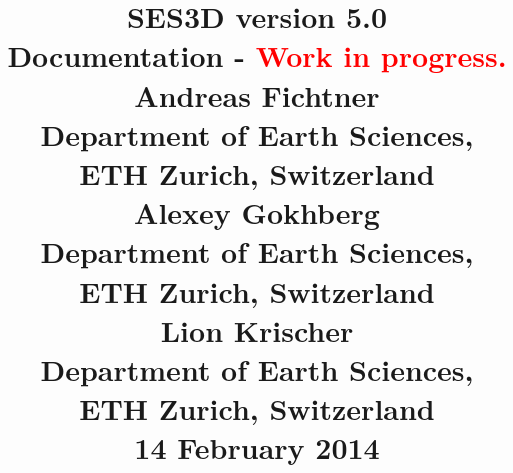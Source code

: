 \documentclass[graybox,envcountchap,sectrefs]{svmono}
\begin{document}
\title{ 	\Huge{\textbf{SES3D} version 5.0}\\[10pt] 
	\large{Documentation - \textcolor{red}{Work in progress.}}\\[100pt]
	\LARGE{Andreas Fichtner}\\[5pt] 
	\normalsize{Department of Earth Sciences, ETH Zurich, Switzerland}\\[15pt]
	\LARGE{Alexey Gokhberg}\\[5pt] 
	\normalsize{Department of Earth Sciences, ETH Zurich, Switzerland}\\[15pt]
	\LARGE{Lion Krischer}\\[5pt]
	\normalsize{Department of Earth Sciences, ETH Zurich, Switzerland}\\[90pt]
	\normalsize{14 February 2014} }

\maketitle

\frontmatter%

\tableofcontents



\mainmatter%


      
	
	                  
	
	                            


          

	        
	
	



\end{document}
